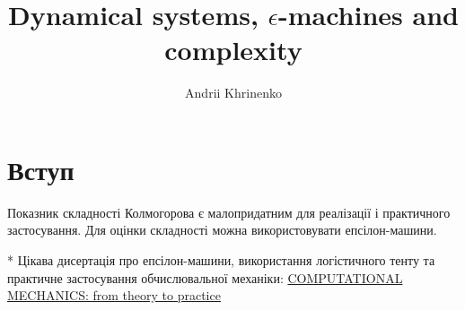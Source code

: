 \documentclass[16pt]{article}
\title{ Dynamical systems, $\epsilon$-machines and complexity }
\author{ Andrii Khrinenko }
\date{}
\begin{document}
	\maketitle	

\section{Вступ}

Показник складності Колмогорова є малопридатним для реалізації і практичного застосування. Для оцінки складності можна використовувати епсілон-машини.

* Цікава дисертація про епсілон-машини, використання логістичного тенту та практичне застосування обчислювальної механіки: \href{https://amslaurea.unibo.it/15649/1/mattia_barbaresi_tesi.pdf}{COMPUTATIONAL MECHANICS: from theory to practice} 
	
	
\end{document}
